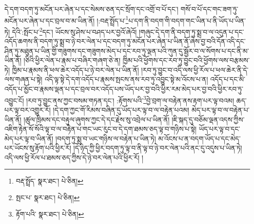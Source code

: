 དེ་དག་བདག་ཏུ་མངོན་པར་ཞེན་པ་དང་སེམས་ཅན་དང་སྲོག་དང་འགྲོ་བ་པོ་དང་། གསོ་བ་པོ་དང་གང་ཟག་ཏུ་མངོན་པར་ཞེན་པ་དང་བྲལ་བ་མ་ཡིན་ནོ། །:བརྡ་སྤྲོད་པ་\footnote{བརྡ་སྤྲོད་  སྣར་ཐང་།  པེ་ཅིན། }པ་དག་ནི་བདག་གི་བདག་གང་ཡིན་པ་ནི་ཡོད་པ་ཡིན་ཏེ། དེའི་:སྤོང་པ་\footnote{སྤང་པ་  སྣར་ཐང་།  པེ་ཅིན། }དང་། ཡོངས་སུ་ཤེས་པ་བཤད་པར་བྱའོ་ཞེའོ། །གཞུང་དེ་དག་ནི་བདག་ཏུ་སྨྲ་བ་ལ་འདུན་པ་དང་འདོད་ཆགས་ནི་བདག་ཏུ་སྨྲ་བ་ཉེ་བར་ལེན་པ་དང་བདག་ཏུ་མངོན་པར་ཞེན་པ་ཡིན་ནོ་ཞེས་བྱ་བའི་དོན་འདི་དང་ཤིན་ཏུ་མཐུན་པ་ཡིན་གྱི་གཟུགས་དང་གཟུགས་མེད་པ་དང་རབ་ཏུ་ལྡན་པའི་ཀུན་དུ་སྦྱོར་བ་ལ་སོགས་པ་དང་ནི་མ་ཡིན་ནོ། །ཅིའི་ཕྱིར་ལེན་པ་རྣམ་པ་བཞིར་གཞག་ཅེ་ན། ཁྱིམ་པའི་ཕྱོགས་དང་རབ་ཏུ་བྱུང་བའི་ཕྱོགས་ལས་བརྩམས་ཏེ། ཁྱིམ་པ་རྣམས་ནི་ཕལ་ཆེར་འདོད་པ་ཉེ་བར་ལེན་པ་ཡིན་ནོ། །རབ་ཏུ་བྱུང་བ་འདི་ལས་ཕྱི་རོལ་པ་ཕལ་ཆེར་ནི་དེ་ལས་གཞན་པ་སྟེ། འདི་ལྟ་སྟེ་དེ་དག་འདོད་པ་རྣམས་སྤངས་ནས་རབ་ཏུ་འབྱུང་སྟེ་མ་འོངས་པ་ན། འདོད་པ་དང་མི་འདོད་པ་མྱོང་བ་རྣམས་ལྡན་པ་དང་བྲལ་བར་འདོད་པས་ཡོད་པར་བྱ་བའི་ཕྱིར་རམ་མེད་པར་བྱ་བའི་ཕྱིར་རབ་ཏུ་འབྱུང་ངོ། །རབ་ཏུ་བྱུང་ནས་ཀྱང་བསམ་གཏན་དང་། :རྟོགས་པའི་\footnote{རྟོག་པའི་  སྣར་ཐང་།  པེ་ཅིན། }བྱེ་བྲག་ལ་བརྟེན་ནས་རྟག་པར་ལྟ་བའམ། ཆད་པར་ལྟ་བར་འགྱུར་རོ། །དེ་དག་ཀྱང་གོ་རིམས་བཞིན་དུ་ཡོད་པར་ལྟ་བ་ལ་བརྟེན་པའམ། མེད་པར་ལྟ་བ་ལ་བརྟེན་པ་ཡིན་ནོ། །ཚུལ་ཁྲིམས་དང་བརྟུལ་ཞུགས་ཀྱང་དེ་དང་རྗེས་སུ་འབྲེལ་པ་ཡིན་ནོ། །ཇི་སྐད་དུ་བཅོམ་ལྡན་འདས་ཀྱིས་འཇིག་རྟེན་སོ་སོའི་ལྟ་བ་ལ་བརྟེན་པ་གང་ཡང་རུང་བ་དེ་དག་ཐམས་ཅད་ལྟ་བ་གཉིས་པ་སྟེ། ཡོད་པར་ལྟ་བ་དང་མེད་པར་ལྟ་བ་ཡིན་ནོ། །བདག་ཏུ་སྨྲ་བ་ཡང་གཉིས་ལ་བརྟེན་པ་ཡིན་ཏེ། མ་འོངས་པ་ན་བདག་ཡོད་པ་དང་མེད་པར་ཡོངས་སུ་རྟོག་པའི་ཕྱིར་རོ། །དེ་ཉིད་ཀྱི་ཕྱིར་བདག་ཏུ་ལྟ་བ་ནི་ལྟ་བ་ཉེ་བར་ལེན་པའི་ནང་དུ་འདུས་པ་ཡིན་ཏེ། འདི་ལས་ཕྱི་རོལ་པ་ཐམས་ཅད་ཀྱིས་དེ་ཉེ་བར་ལེན་པའི་ཕྱིར་རོ། །
